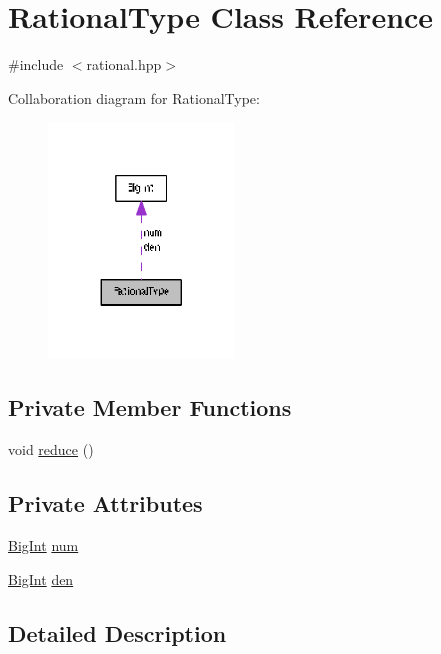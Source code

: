 \hypertarget{class_rational_type}{}\section{Rational\+Type Class Reference}
\label{class_rational_type}


{\ttfamily \#include $<$rational.\+hpp$>$}



Collaboration diagram for Rational\+Type\+:\nopagebreak
\begin{figure}[H]
\begin{center}
\leavevmode
\includegraphics[width=140pt]{class_rational_type__coll__graph}
\end{center}
\end{figure}
\subsection*{Private Member Functions}
\begin{DoxyCompactItemize}
\item 
void \hyperlink{class_rational_type_ab0173d0fb9a0ca208d52cae36adee9bc}{reduce} ()
\end{DoxyCompactItemize}
\subsection*{Private Attributes}
\begin{DoxyCompactItemize}
\item 
\hyperlink{class_big_int}{Big\+Int} \hyperlink{class_rational_type_a58e9bbd85d6b1e294f4c43e0720aab1b}{num}
\item 
\hyperlink{class_big_int}{Big\+Int} \hyperlink{class_rational_type_a627974c03034d239eb30970d30bba030}{den}
\end{DoxyCompactItemize}


\subsection{Detailed Description}


